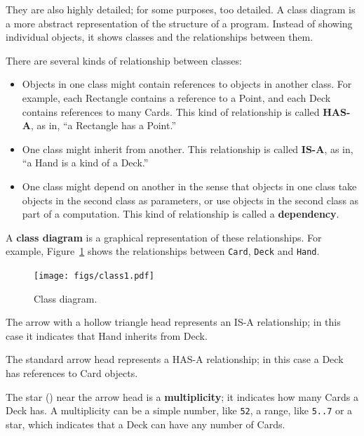 \documentclass[10pt]{book}
\begin{document}
They are also highly detailed; for some purposes, too
detailed.  A class diagram is a more abstract representation
of the structure of a program.  Instead of showing individual
objects, it shows classes and the relationships between them.

There are several kinds of relationship between classes:

\begin{itemize}

\item Objects in one class might contain references to objects
in another class.  For example, each Rectangle contains a reference
to a Point, and each Deck contains references to many Cards.
This kind of relationship is called {\bf HAS-A}, as in, ``a Rectangle
has a Point.''

\item One class might inherit from another.  This relationship
is called {\bf IS-A}, as in, ``a Hand is a kind of a Deck.''

\item One class might depend on another in the sense that objects
in one class take objects in the second class as parameters, or
use objects in the second class as part of a computation.  This
kind of relationship is called a {\bf dependency}.

\end{itemize}

A {\bf class diagram} is a graphical representation of these
relationships.  For example, Figure~\ref{fig.class1} shows the
relationships between {\tt Card}, {\tt Deck} and {\tt Hand}.

\begin{figure}
\centerline
{\texttt{[image: figs/class1.pdf]}}
\caption{Class diagram.}
\label{fig.class1}
\end{figure}

The arrow with a hollow triangle head represents an IS-A
relationship; in this case it indicates that Hand inherits
from Deck.

The standard arrow head represents a HAS-A
relationship; in this case a Deck has references to Card
objects.

The star ({\tt *}) near the arrow head is a
{\bf multiplicity}; it indicates how many Cards a Deck has.
A multiplicity can be a simple number, like {\tt 52}, a range,
like {\tt 5..7} or a star, which indicates that a Deck can
have any number of Cards.
\end{document}
